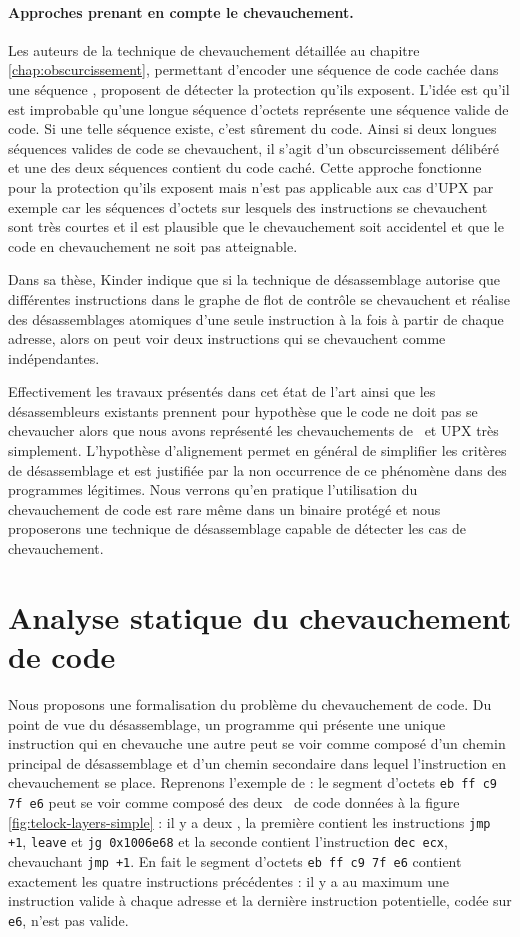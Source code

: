 \paragraph{Approches prenant en compte le chevauchement.}
Les auteurs de la technique de chevauchement détaillée au chapitre \ref{chap:obscurcissement}, permettant d'encoder une séquence de code cachée dans une séquence \cite{JLH13}, proposent de détecter la protection qu'ils exposent. 
L'idée est qu'il est improbable qu'une longue séquence d'octets représente une séquence valide de code. 
Si une telle séquence existe, c'est sûrement du code. Ainsi si deux longues séquences valides de code se chevauchent, il s'agit d'un obscurcissement délibéré et une des deux séquences contient du code caché. 
Cette approche fonctionne pour la protection qu'ils exposent mais n'est pas applicable aux cas d'UPX par exemple car les séquences d'octets sur lesquels des instructions se chevauchent sont très courtes et il est plausible que le chevauchement soit accidentel et que le code en chevauchement ne soit pas atteignable.

Dans sa thèse, Kinder \cite{Kinder10} indique que si la technique de désassemblage autorise que différentes instructions dans le graphe de flot de contrôle se chevauchent et réalise des désassemblages atomiques d'une seule instruction à la fois à partir de chaque adresse, alors on peut voir deux instructions qui se chevauchent comme indépendantes.

Effectivement les travaux présentés dans cet état de l'art ainsi que les désassembleurs existants prennent pour hypothèse que le code ne doit pas se chevaucher alors que nous avons représenté les chevauchements de \telock\ et UPX très simplement. 
L'hypothèse d'alignement permet en général de simplifier les critères de désassemblage et est justifiée par la non occurrence de ce phénomène dans des programmes légitimes.
Nous verrons qu'en pratique l'utilisation du chevauchement de code est rare même dans un binaire protégé et nous proposerons une technique de désassemblage capable de détecter les cas de chevauchement.

\section{Analyse statique du chevauchement de code}
Nous proposons une formalisation du problème du chevauchement de code.
Du point de vue du désassemblage, un programme qui présente une unique instruction qui en chevauche une autre peut se voir comme composé d'un chemin principal de désassemblage et d'un chemin secondaire dans lequel l'instruction en chevauchement se place.
Reprenons l'exemple de \telock : le segment d'octets \texttt{eb ff c9 7f e6} peut se voir comme composé des deux \layers\ de code données à la figure \ref{fig:telock-layers-simple} : il y a deux \layers, la première contient les instructions \texttt{jmp +1}, \texttt{leave} et \texttt{jg 0x1006e68} et la seconde contient l'instruction \texttt{dec ecx}, chevauchant \texttt{jmp +1}.
En fait le segment d'octets \texttt{eb ff c9 7f e6} contient exactement les quatre instructions précédentes : il y a au maximum une instruction valide à chaque adresse et la dernière instruction potentielle, codée sur \texttt{e6}, n'est pas valide.


